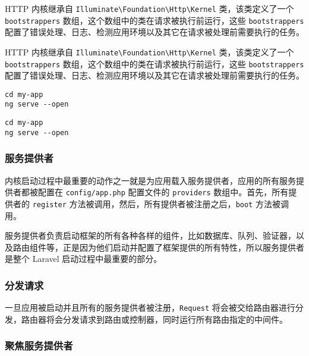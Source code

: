 \documentclass{progartcn}
\begin{document}
\begin{notebox}
  HTTP 内核继承自 \verb|Illuminate\Foundation\Http\Kernel| 类，该类定义了一个 \verb|bootstrappers| 数组，这个数组中的类在请求被执行前运行，这些 \verb|bootstrappers| 配置了错误处理、日志、检测应用环境以及其它在请求被处理前需要执行的任务。
\end{notebox}

\begin{importantbox}
  HTTP 内核继承自 \verb|Illuminate\Foundation\Http\Kernel| 类，该类定义了一个 \verb|bootstrappers| 数组，这个数组中的类在请求被执行前运行，这些 \verb|bootstrappers| 配置了错误处理、日志、检测应用环境以及其它在请求被处理前需要执行的任务。
\end{importantbox}

\begin{shellbox}
\begin{verbatim}
cd my-app
ng serve --open
\end{verbatim}
\end{shellbox}

\begin{invertedshellbox}
\begin{verbatim}
cd my-app
ng serve --open
\end{verbatim}
\end{invertedshellbox}


\subsubsection{服务提供者}

内核启动过程中最重要的动作之一就是为应用载入服务提供者，应用的所有服务提供者都被配置在 \verb|config/app.php| 配置文件的 \verb|providers| 数组中。首先，所有提供者的 \verb|register| 方法被调用，然后，所有提供者被注册之后，\verb|boot| 方法被调用。

服务提供者负责启动框架的所有各种各样的组件，比如数据库、队列、验证器，以及路由组件等，正是因为他们启动并配置了框架提供的所有特性，所以服务提供者是整个 Laravel 启动过程中最重要的部分。

\subsubsection{分发请求}

一旦应用被启动并且所有的服务提供者被注册，\verb|Request| 将会被交给路由器进行分发，路由器将会分发请求到路由或控制器，同时运行所有路由指定的中间件。

\subsubsection{聚焦服务提供者}
\end{document}
